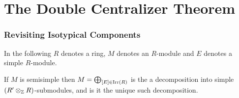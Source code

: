 \section{The Double Centralizer Theorem}





\subsubsection{Revisiting Isotypical Components}


\begin{conventions}
  In the following $R$ denotes a ring, $M$ denotes an $R$-module and $E$ denotes a simple $R$-module.
\end{conventions}


\begin{corollary}
  If $M$ is semisimple then $M = \bigoplus_{[E] \in \operatorname{Irr}(R)}$ is the a decomposition into simple $(R' \otimes_{\mathbb{Z}} R)$-submodules, and is it the unique such decomposition.
\end{corollary}

